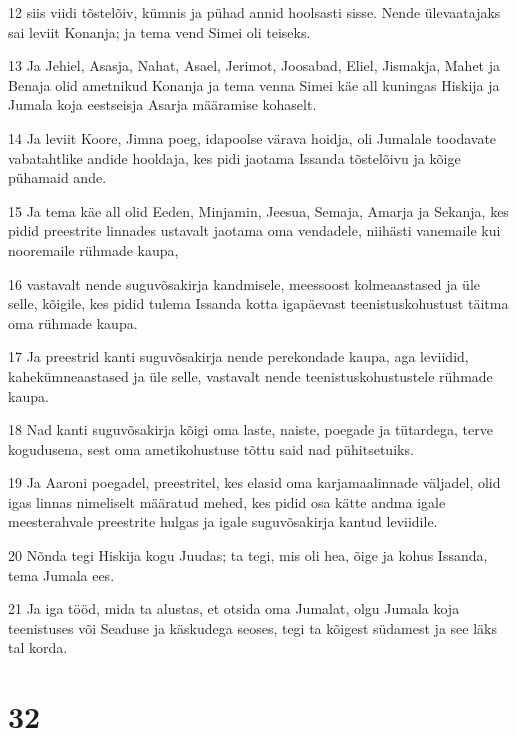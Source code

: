 \par 12 siis viidi tõstelõiv, kümnis ja pühad annid hoolsasti sisse. Nende ülevaatajaks sai leviit Konanja; ja tema vend Simei oli teiseks.
\par 13 Ja Jehiel, Asasja, Nahat, Asael, Jerimot, Joosabad, Eliel, Jismakja, Mahet ja Benaja olid ametnikud Konanja ja tema venna Simei käe all kuningas Hiskija ja Jumala koja eestseisja Asarja määramise kohaselt.
\par 14 Ja leviit Koore, Jimna poeg, idapoolse värava hoidja, oli Jumalale toodavate vabatahtlike andide hooldaja, kes pidi jaotama Issanda tõstelõivu ja kõige pühamaid ande.
\par 15 Ja tema käe all olid Eeden, Minjamin, Jeesua, Semaja, Amarja ja Sekanja, kes pidid preestrite linnades ustavalt jaotama oma vendadele, niihästi vanemaile kui nooremaile rühmade kaupa,
\par 16 vastavalt nende suguvõsakirja kandmisele, meessoost kolmeaastased ja üle selle, kõigile, kes pidid tulema Issanda kotta igapäevast teenistuskohustust täitma oma rühmade kaupa.
\par 17 Ja preestrid kanti suguvõsakirja nende perekondade kaupa, aga leviidid, kahekümneaastased ja üle selle, vastavalt nende teenistuskohustustele rühmade kaupa.
\par 18 Nad kanti suguvõsakirja kõigi oma laste, naiste, poegade ja tütardega, terve kogudusena, sest oma ametikohustuse tõttu said nad pühitsetuiks.
\par 19 Ja Aaroni poegadel, preestritel, kes elasid oma karjamaalinnade väljadel, olid igas linnas nimeliselt määratud mehed, kes pidid osa kätte andma igale meesterahvale preestrite hulgas ja igale suguvõsakirja kantud leviidile.
\par 20 Nõnda tegi Hiskija kogu Juudas; ta tegi, mis oli hea, õige ja kohus Issanda, tema Jumala ees.
\par 21 Ja iga tööd, mida ta alustas, et otsida oma Jumalat, olgu Jumala koja teenistuses või Seaduse ja käskudega seoses, tegi ta kõigest südamest ja see läks tal korda.

\chapter{32}

